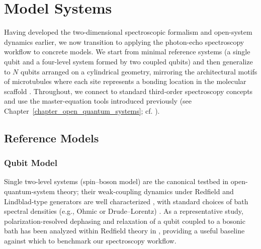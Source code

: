 \chapter{Model Systems}

\label{chapter_model_systems}

Having developed the two-dimensional spectroscopic formalism and open-system dynamics earlier, we now transition to applying the photon-echo spectroscopy workflow to concrete models. We start from minimal reference systems (a single qubit and a four-level system formed by two coupled qubits) and then generalize to $N$ qubits arranged on a cylindrical geometry, mirroring the architectural motifs of microtubules where each site represents a bonding location in the molecular scaffold \cite{kalraetal2023electronicenergymigration}. Throughout, we connect to standard third-order spectroscopy concepts \cite{mukamel1995principlesnonlinearoptical,jonas2003twodimensionalfemtosecondspectroscopy,cho2009twodimensionalopticalspectroscopy} and use the master-equation tools introduced previously (see Chapter~\ref{chapter_open_quantum_systems}; cf. \cite{breuerpetruccione2009theoryopenquantum,redfield1965theoryrelaxationprocesses}).


\section{Reference Models}

\subsection{Qubit Model}
Single two-level systems (spin–boson model) are the canonical testbed in open-quantum-system theory; their weak-coupling dynamics under Redfield and Lindblad-type generators are well characterized \cite{redfield1965theoryrelaxationprocesses,breuerpetruccione2009theoryopenquantum,manzano2020shortintroductionlindblad,campaiolietal2024quantummasterequations}, with standard choices of bath spectral densities (e.g., Ohmic or Drude–Lorentz) \cite{ritscheleisfeld2014analyticrepresentationsbath}. As a representative study, polarization-resolved dephasing and relaxation of a qubit coupled to a bosonic bath has been analyzed within Redfield theory in \cite{palmnalbach2019dephasingrelaxationalpolarized}, providing a useful baseline against which to benchmark our spectroscopy workflow.

